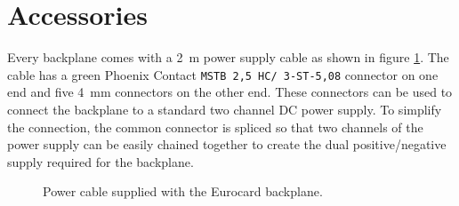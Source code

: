\documentclass[10pt]{datasheet}
\begin{document}
\section{Accessories}
Every backplane comes with a \qty{2}{\m} power supply cable as shown in figure \ref{fig:power_cable}. The cable has a green Phoenix Contact \texttt{\small{MSTB 2,5 HC/ 3-ST-5,08}} connector on one end and five \qty{4}{\mm} connectors on the other end. These connectors can be used to connect the backplane to a standard two channel DC power supply. To simplify the connection, the common connector is spliced so that two channels of the power supply can be easily chained together to create the dual positive/negative supply required for the backplane.

\begin{figure}[ht]
    \caption{Power cable supplied with the Eurocard backplane.}
    \label{fig:power_cable}
    \centering
    
\end{figure}
\end{document}
